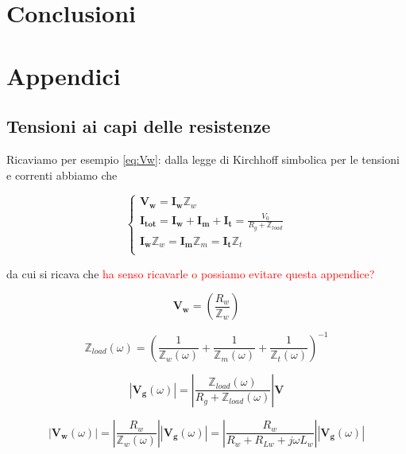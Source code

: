 \documentclass[12pt,italian]{article}
\newcommand{\err}[1]{\textcolor{red}{#1}}
\begin{document}
\section*{Conclusioni}

\appendix
\section{Appendici}
\subsection{Tensioni ai capi delle resistenze}
\label{sec:tensioni}

Ricaviamo per esempio \eqref{eq:Vw}: dalla legge di Kirchhoff simbolica per le
tensioni e correnti abbiamo che

\begin{equation}
	\begin{cases}
		\mathbf{V_{w}} = \mathbf{I_{w}} \mathbb{Z}_{w}                                                                \\
		\mathbf{I_{tot}} = \mathbf{I_{w}} + \mathbf{I_{m}} + \mathbf{I_{t}} = \frac{V_{0}}{R_{g} + \mathbb{Z}_{load}} \\
		\mathbf{I_{w}} \mathbb{Z}_{w} = \mathbf{I_{m}} \mathbb{Z}_{m} = \mathbf{I_{t}} \mathbb{Z}_{t}                 \\
	\end{cases}
\end{equation}

\noindent
da cui si ricava che \err{ha senso ricavarle o possiamo evitare questa appendice?}

\begin{equation}
	\mathbf{V_{w}} = \left( \frac{R_{w}}{\mathbb{Z}_{w}} \right)
\end{equation}

\begin{equation*}
	\mathbb{Z}_{load}(\omega) = \left(\frac{1}{\mathbb{Z}_{w}(\omega)} + \frac{1}{\mathbb{Z}_{m}(\omega)} + \frac{1}{\mathbb{Z}_{t}(\omega)}\right)^{-1}
\end{equation*}

\begin{equation}
	\left| \mathbf{V_{g}}(\omega) \right| = \left| \frac{\mathbb{Z}_{load}(\omega)}
	{R_{g}+\mathbb{Z}_{load}(\omega)}\right| \mathbf{V}
\end{equation}

\begin{equation}
	\left| \mathbf{V_{w}}(\omega) \right| = \left| \frac{R_{w}}
	{\mathbb{Z}_{w}(\omega)}\right|\left| \mathbf{V_{g}}(\omega) \right| = \left| \frac{R_{w}}
	{R_{w}+R_{Lw} + j \omega L_w}\right|\left| \mathbf{V_{g}}(\omega) \right|
\end{equation}
\end{document}
